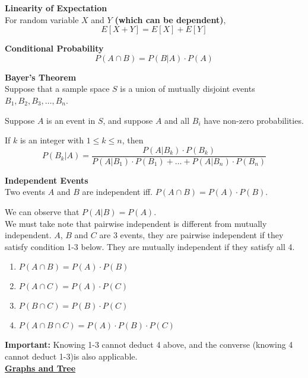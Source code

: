 \documentclass[a4paper]{article}
\newcommand{\heading}[1]{{\small\underline{\textbf{#1}}}}
\newcommand{\subheading}[1]{{\scriptsize\textbf{#1}}}
\begin{document}
\begin{multicols*}{4}
\subheading{Linearity of Expectation}\\
For random variable $X$ and $Y$ \textbf{(which can be dependent)},
$$E{[X + Y]} = E{[X]} + E{[Y]}$$

\subheading{Conditional Probability}\\
$$P(A \cap B) = P(B|A) \cdot P(A)$$

\subheading{Bayer's Theorem}\\
Suppose that a sample space $S$ is a union of mutually disjoint events $B_1, B_2, B_3, \dots, B_n$.

Suppose $A$ is an event in $S$, and suppose $A$ and all $B_i$ have non-zero probabilities. 

If $k$ is an integer with $1 \leq k \leq n$, then
$$P(B_k|A) = \frac{P(A|B_k) \cdot P(B_k)}{P(A|B_1) \cdot P(B_1) + \dots + P(A|B_n) \cdot P(B_n)}$$

\subheading{Independent Events}\\
Two events $A$ and $B$ are independent iff. $P(A \cap B) = P(A) \cdot P(B)$.

We can observe that $P(A|B) = P(A)$.\\

We must take note that pairwise independent is different from mutually independent. $A$, $B$ and $C$ are 3 events, they are pairwise independent if they satisfy condition 1-3 below. They are mutually independent if they satisfy all 4.
\begin{enumerate}
	\item $P(A \cap B) = P(A) \cdot P(B)$
	\item $P(A \cap C) = P(A) \cdot P(C)$
	\item $P(B \cap C) = P(B) \cdot P(C)$
	\item $P(A \cap B \cap C) = P(A) \cdot P(B) \cdot P(C)$
\end{enumerate}
\textbf{Important:} Knowing 1-3 cannot deduct 4 above, and the converse (knowing 4 cannot deduct 1-3)is also applicable.\\

\heading{Graphs and Tree}\\


\end{multicols*}
\end{document}
